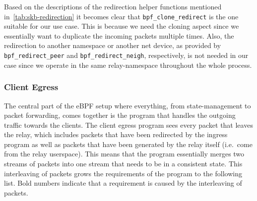 \noindent
Based on the descriptions of the redirection helper functions mentioned in~\autoref{tab:skb-redirection}
it becomes clear that \verb|bpf_clone_redirect| is the one suitable for our use case. 
This is because we need the cloning aspect since we essentially want to duplicate the incoming packets multiple times.
Also, the redirection to another namespace or another net device, as provided by \verb|bpf_redirect_peer| and
\verb|bpf_redirect_neigh|, respectively, is not needed in our case since we operate in the same relay-namespace
throughout the whole process.

\subsubsection{Client Egress}\label{sec:client-egress}
The central part of the eBPF setup where everything, from state-management to packet forwarding, 
comes together is the program that handles the outgoing traffic towards the clients.
The client egress program sees every packet that leaves the relay, which includes packets that have 
been redirected by the ingress program as well as packets that have been generated by the relay itself
(i.e.~come from the relay userspace).
This means that the program essentially merges two streams of packets into one stream that needs to 
be in a consistent state.
This interleaving of packets grows the requirements of the program to the following list.
Bold numbers indicate that a requirement is caused by the interleaving of packets.
